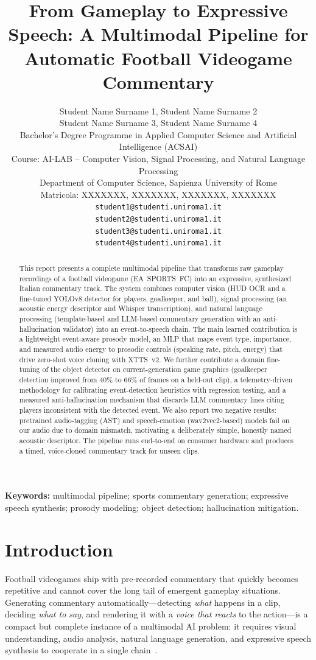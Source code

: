 \documentclass[10pt,twocolumn,a4paper]{article}
\title{\textbf{From Gameplay to Expressive Speech: A Multimodal Pipeline for Automatic Football Videogame Commentary}}
\author{
	Student Name Surname 1, Student Name Surname 2\\
	Student Name Surname 3, Student Name Surname 4\\
	Bachelor's Degree Programme in Applied Computer Science and Artificial Intelligence (ACSAI)\\
	Course: AI-LAB -- Computer Vision, Signal Processing, and Natural Language Processing\\
	Department of Computer Science, Sapienza University of Rome\\
	Matricola: XXXXXXX, XXXXXXX, XXXXXXX, XXXXXXX\\
	\texttt{student1@studenti.uniroma1.it}\\
	\texttt{student2@studenti.uniroma1.it}\\
	\texttt{student3@studenti.uniroma1.it}\\
	\texttt{student4@studenti.uniroma1.it}
}
\date{}
\begin{document}
	\maketitle

	\begin{abstract}
		This report presents a complete multimodal pipeline that transforms raw gameplay recordings of a football videogame (EA~SPORTS~FC) into an expressive, synthesized Italian commentary track. The system combines computer vision (HUD OCR and a fine-tuned YOLOv8 detector for players, goalkeeper, and ball), signal processing (an acoustic energy descriptor and Whisper transcription), and natural language processing (template-based and LLM-based commentary generation with an anti-hallucination validator) into an event-to-speech chain. The main learned contribution is a lightweight event-aware prosody model, an MLP that maps event type, importance, and measured audio energy to prosodic controls (speaking rate, pitch, energy) that drive zero-shot voice cloning with XTTS~v2. We further contribute a domain fine-tuning of the object detector on current-generation game graphics (goalkeeper detection improved from 40\% to 66\% of frames on a held-out clip), a telemetry-driven methodology for calibrating event-detection heuristics with regression testing, and a measured anti-hallucination mechanism that discards LLM commentary lines citing players inconsistent with the detected event. We also report two negative results: pretrained audio-tagging (AST) and speech-emotion (wav2vec2-based) models fail on our audio due to domain mismatch, motivating a deliberately simple, honestly named acoustic descriptor. The pipeline runs end-to-end on consumer hardware and produces a timed, voice-cloned commentary track for unseen clips.
	\end{abstract}

	\noindent\textbf{Keywords:} multimodal pipeline; sports commentary generation; expressive speech synthesis; prosody modeling; object detection; hallucination mitigation.

	\section{Introduction}

	Football videogames ship with pre-recorded commentary that quickly becomes repetitive and cannot cover the long tail of emergent gameplay situations. Generating commentary automatically---detecting \emph{what} happens in a clip, deciding \emph{what to say}, and rendering it with a \emph{voice that reacts} to the action---is a compact but complete instance of a multimodal AI problem: it requires visual understanding, audio analysis, natural language generation, and expressive speech synthesis to cooperate in a single chain~\cite{lecun2015deep}.
\end{document}
